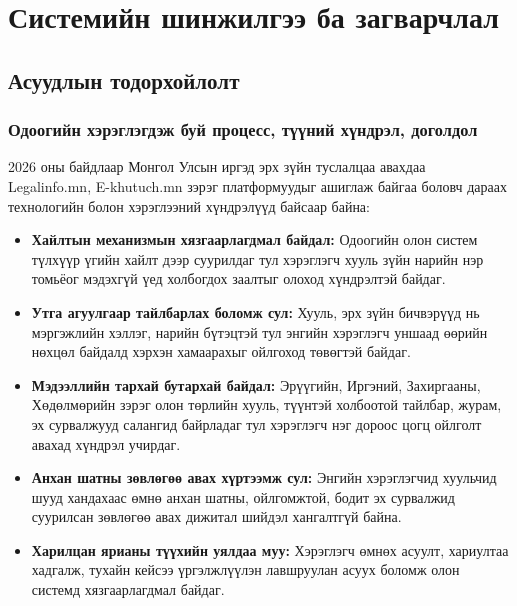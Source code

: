 
\chapter{Системийн шинжилгээ ба загварчлал}
\label{Chapter2}

\section{Асуудлын тодорхойлолт}
\subsection{Одоогийн хэрэглэгдэж буй процесс, түүний хүндрэл, доголдол}

2026 оны байдлаар Монгол Улсын иргэд эрх зүйн туслалцаа авахдаа Legalinfo.mn, E-khutuch.mn зэрэг платформуудыг ашиглаж байгаа боловч дараах технологийн болон хэрэглээний хүндрэлүүд байсаар байна:

\begin{itemize}
    \item \textbf{Хайлтын механизмын хязгаарлагдмал байдал:} Одоогийн олон систем түлхүүр үгийн хайлт дээр суурилдаг тул хэрэглэгч хууль зүйн нарийн нэр томьёог мэдэхгүй үед холбогдох заалтыг олоход хүндрэлтэй байдаг.

    \item \textbf{Утга агуулгаар тайлбарлах боломж сул:} Хууль, эрх зүйн бичвэрүүд нь мэргэжлийн хэллэг, нарийн бүтэцтэй тул энгийн хэрэглэгч уншаад өөрийн нөхцөл байдалд хэрхэн хамаарахыг ойлгоход төвөгтэй байдаг.

    \item \textbf{Мэдээллийн тархай бутархай байдал:} Эрүүгийн, Иргэний, Захиргааны, Хөдөлмөрийн зэрэг олон төрлийн хууль, түүнтэй холбоотой тайлбар, журам, эх сурвалжууд салангид байрладаг тул хэрэглэгч нэг дороос цогц ойлголт авахад хүндрэл учирдаг.

    \item \textbf{Анхан шатны зөвлөгөө авах хүртээмж сул:} Энгийн хэрэглэгчид хуульчид шууд хандахаас өмнө анхан шатны, ойлгомжтой, бодит эх сурвалжид суурилсан зөвлөгөө авах дижитал шийдэл хангалтгүй байна.

    \item \textbf{Харилцан ярианы түүхийн уялдаа муу:} Хэрэглэгч өмнөх асуулт, хариултаа хадгалж, тухайн кейсээ үргэлжлүүлэн лавшруулан асуух боломж олон системд хязгаарлагдмал байдаг.
\end{itemize}

